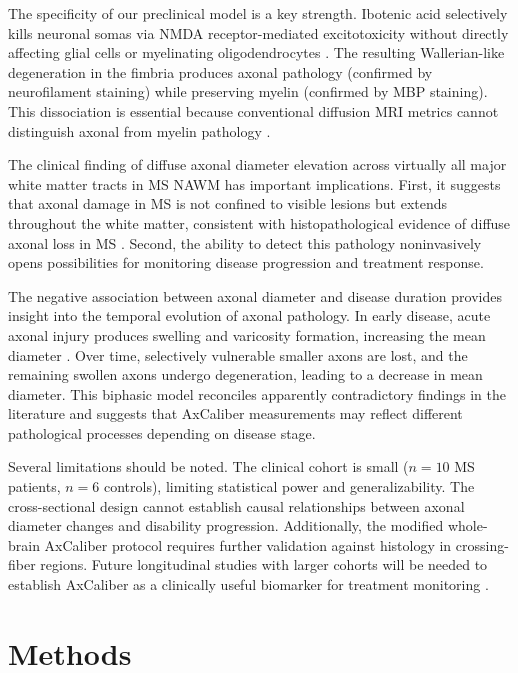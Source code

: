 \documentclass[11pt]{article}
\begin{document}
The specificity of our preclinical model is a key strength. Ibotenic acid selectively kills neuronal somas via NMDA receptor-mediated excitotoxicity without directly affecting glial cells or myelinating oligodendrocytes \citep{paxinos2007rat}. The resulting Wallerian-like degeneration in the fimbria produces axonal pathology (confirmed by neurofilament staining) while preserving myelin (confirmed by MBP staining). This dissociation is essential because conventional diffusion MRI metrics cannot distinguish axonal from myelin pathology \citep{alexander2010diffusion}.

The clinical finding of diffuse axonal diameter elevation across virtually all major white matter tracts in MS NAWM has important implications. First, it suggests that axonal damage in MS is not confined to visible lesions but extends throughout the white matter, consistent with histopathological evidence of diffuse axonal loss in MS \citep{kutzelnigg2005cortical}. Second, the ability to detect this pathology noninvasively opens possibilities for monitoring disease progression and treatment response.

The negative association between axonal diameter and disease duration provides insight into the temporal evolution of axonal pathology. In early disease, acute axonal injury produces swelling and varicosity formation, increasing the mean diameter \citep{nikic2011protective}. Over time, selectively vulnerable smaller axons are lost, and the remaining swollen axons undergo degeneration, leading to a decrease in mean diameter. This biphasic model reconciles apparently contradictory findings in the literature and suggests that AxCaliber measurements may reflect different pathological processes depending on disease stage.

Several limitations should be noted. The clinical cohort is small ($n = 10$ MS patients, $n = 6$ controls), limiting statistical power and generalizability. The cross-sectional design cannot establish causal relationships between axonal diameter changes and disability progression. Additionally, the modified whole-brain AxCaliber protocol requires further validation against histology in crossing-fiber regions. Future longitudinal studies with larger cohorts will be needed to establish AxCaliber as a clinically useful biomarker for treatment monitoring \citep{thompson2018diagnosis}.

\section{Methods}
\end{document}
